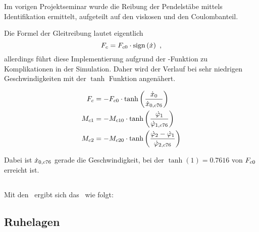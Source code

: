 Im vorigen Projektseminar \cite{ribeiro} wurde die Reibung der Pendelstäbe mittels Identifikation ermittelt, aufgeteilt auf den viskosen und den Coulombanteil.

Die Formel der Gleitreibung lautet eigentlich 
	\[
	F_c = F_{c0}  \cdot  \mathrm{sign}\left(\dot{x}\right) \ ,
\]
allerdings führt diese Implementierung aufgrund der -Funktion zu Komplikationen in der Simulation. Daher wird der Verlauf bei sehr niedrigen Geschwindigkeiten mit der $\tanh$ Funktion angenähert.

\begin{align}
	F_c  &= -F_{c0}  \cdot \tanh{\left(\frac{\dot{x}_0}{\dot{x}_{0,c76}}\right)}  \\
	M_{c1} &= -M_{c10} \cdot \tanh{\left(\frac{\dot{\varphi}_1}{\dot{\varphi}_{1,c76}}\right)}  \\
	M_{c2} &= -M_{c20} \cdot \tanh{\left(\frac{\dot{\varphi}_2-\dot{\varphi}_1}{\dot{\varphi}_{2,c76}}\right)}
\end{align}

Dabei ist $\dot{x}_{0,c76}$ gerade die Geschwindigkeit, bei der $\tanh(1)=0.7616$ von $F_{c0}$ erreicht ist.



\subsection{\zrm}

Mit den \bwgl\ ergibt sich das \nlzrm\ wie folgt:



\subsection{Ruhelagen}


